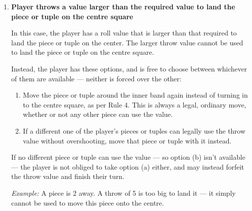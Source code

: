 \documentclass[10pt,a4paper]{article}
\begin{document}
\begin{enumerate}[leftmargin=2em]
    \emph{Example:} A 2-tuple is 5 squares away from the centre and a single piece is 8 squares away.
    A throw of 6 falls short of the 10 needed to land the 2-tuple 
    or the 8 needed to land the single piece on the centre, 
    but the throw is still usable. The player must use the throw
    value and decide which of their pieces or tuples to move.

    \begin{center}
      
    \end{center}


  \item \textbf{Player throws a value larger than the required value to land the piece or tuple on the centre square}

    In this case, the player has a roll value that is larger than that required to land the piece or tuple
    on the center. The larger throw value cannot be used to land the piece or tuple on the centre square.

    Instead, the player has these options, and is free to choose between
    whichever of them are available --- neither is forced over the other:

    \begin{enumerate}[label=(\alph*)]
      \item Move the piece or tuple around the inner band again instead of
        turning in to the centre square, as per Rule 4. This is always a
        legal, ordinary move, whether or not any other piece can use the
        value.
      \item If a different one of the player's pieces or tuples can legally
        use the throw value without overshooting, move that piece or tuple
        with it instead.
    \end{enumerate}

    If no different piece or tuple can use the value --- so option (b)
    isn't available --- the player is not obliged to take option (a)
    either, and may instead forfeit the throw value and finish their turn.

    \emph{Example:} A piece is 2 away. A throw of 5 is too big to land it
    --- it simply cannot be used to move this piece onto the centre.

    \begin{center}
      
    \end{center}


\end{enumerate}
\end{document}
